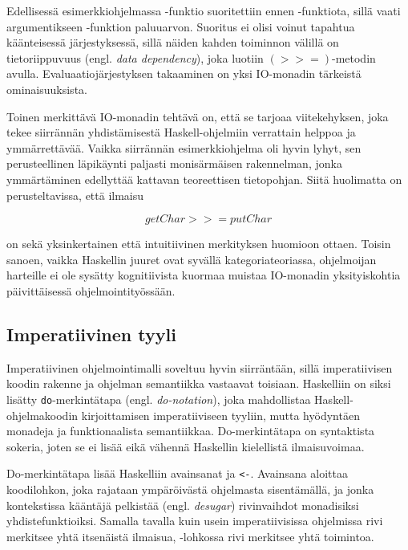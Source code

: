 \documentclass[finnish]{tktltiki2}
\begin{document}
Edellisessä esimerkkiohjelmassa -funktio suoritettiin ennen -funktiota,
sillä  vaati argumentikseen -funktion paluuarvon. Suoritus ei olisi
voinut tapahtua käänteisessä järjestyksessä, sillä näiden kahden toiminnon välillä on
tietoriippuvuus (engl. \emph{data dependency}), joka luotiin $(>>=)$-metodin avulla.
Evaluaatiojärjestyksen takaaminen on yksi IO-monadin tärkeistä ominaisuuksista.

Toinen merkittävä IO-monadin tehtävä on, että se tarjoaa viitekehyksen, joka tekee siirrännän
yhdistämisestä Haskell-ohjelmiin verrattain helppoa ja ymmärrettävää. Vaikka siirrännän
esimerkkiohjelma oli hyvin lyhyt, sen perusteellinen läpikäynti paljasti monisärmäisen rakennelman,
jonka ymmärtäminen edellyttää kattavan teoreettisen tietopohjan. Siitä huolimatta on
perusteltavissa, että ilmaisu

$$ getChar >>= putChar $$

on sekä yksinkertainen että intuitiivinen merkityksen huomioon ottaen. Toisin sanoen, vaikka
Haskellin juuret ovat syvällä kategoriateoriassa, ohjelmoijan harteille ei ole sysätty kognitiivista
kuormaa muistaa IO-monadin yksityiskohtia päivittäisessä ohjelmointityössään.

\subsection{Imperatiivinen tyyli}


Imperatiivinen ohjelmointimalli soveltuu hyvin siirräntään, sillä imperatiivisen koodin rakenne ja
ohjelman semantiikka vastaavat toisiaan. Haskelliin on siksi lisätty \verb|do|-merkintätapa (engl.
\emph{do-notation}), joka mahdollistaa Haskell-ohjelmakoodin kirjoittamisen imperatiiviseen tyyliin,
mutta hyödyntäen monadeja ja funktionaalista semantiikkaa. Do-merkintätapa on syntaktista sokeria,
joten se ei lisää eikä vähennä Haskellin kielellistä ilmaisuvoimaa.

Do-merkintätapa lisää Haskelliin avainsanat  ja \verb|<-|. Avainsana  aloittaa
koodilohkon, joka rajataan ympäröivästä ohjelmasta sisentämällä, ja jonka kontekstissa kääntäjä
pelkistää (engl. \emph{desugar}) rivinvaihdot monadisiksi yhdistefunktioiksi. Samalla tavalla kuin
usein imperatiivisissa ohjelmissa rivi merkitsee yhtä itsenäistä ilmaisua, -lohkossa rivi
merkitsee yhtä toimintoa.
\end{document}
